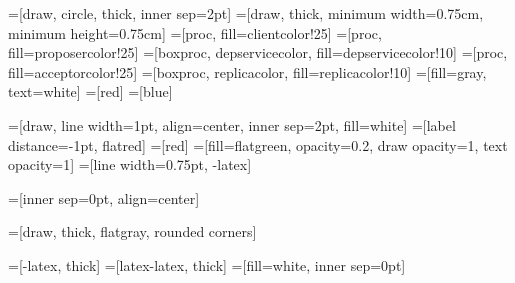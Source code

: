 =[draw, circle, thick, inner sep=2pt]
=[draw, thick, minimum width=0.75cm, minimum height=0.75cm]
=[proc, fill=clientcolor!25]
=[proc, fill=proposercolor!25]
=[boxproc, depservicecolor, fill=depservicecolor!10]
=[proc, fill=acceptorcolor!25]
=[boxproc, replicacolor, fill=replicacolor!10]
=[fill=gray, text=white]
=[red]
=[blue]

=[draw, line width=1pt, align=center, inner sep=2pt, fill=white]
=[label distance=-1pt, flatred]
=[red]
=[fill=flatgreen, opacity=0.2, draw opacity=1,
                      text opacity=1]
=[line width=0.75pt, -latex]

=[inner sep=0pt, align=center]

=[draw, thick, flatgray, rounded corners]

=[-latex, thick]
=[latex-latex, thick]
=[fill=white, inner sep=0pt]

